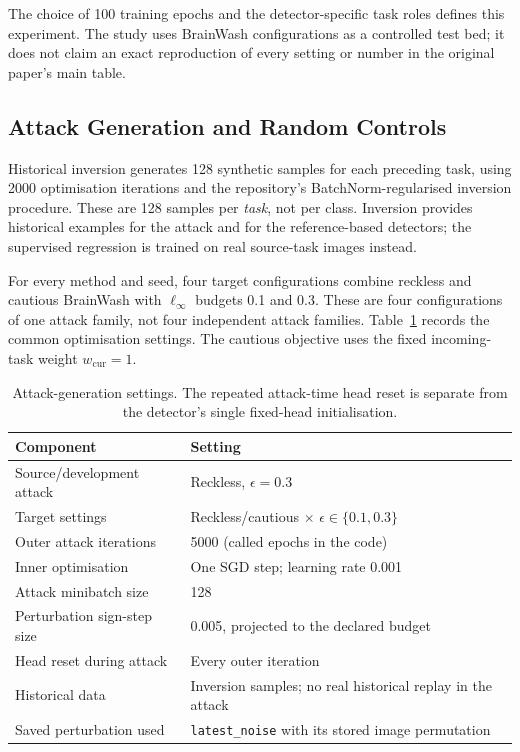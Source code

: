 The choice of 100 training epochs and the detector-specific task roles
defines this experiment. The study uses BrainWash configurations as a
controlled test bed; it does not claim an exact reproduction of every
setting or number in the original paper's main table.

\subsection{Attack Generation and Random Controls}
\label{subsec:setup-attacks}

Historical inversion generates 128 synthetic samples for each preceding
task, using 2000 optimisation iterations and the repository's
BatchNorm-regularised inversion procedure. These are 128 samples per
\emph{task}, not per class. Inversion provides historical examples for the
attack and for the reference-based detectors; the supervised regression is
trained on real source-task images instead.

For every method and seed, four target configurations combine reckless
and cautious BrainWash with $\ell_\infty$ budgets 0.1 and 0.3. These are
four configurations of one attack family, not four independent attack
families. Table~\ref{tab:setup-attack} records the common optimisation
settings. The cautious objective uses the fixed incoming-task weight
$w_{\mathrm{cur}}=1$.

\begin{table}[tbp]
\centering
\small
\begin{tabularx}{\textwidth}{p{5.5cm}X}
\toprule
Component & Setting\\
\midrule
Source/development attack & Reckless, $\epsilon=0.3$\\
Target settings & Reckless/cautious $\times$ $\epsilon\in\{0.1,0.3\}$\\
Outer attack iterations & 5000 (called epochs in the code)\\
Inner optimisation & One SGD step; learning rate 0.001\\
Attack minibatch size & 128\\
Perturbation sign-step size & 0.005, projected to the declared budget\\
Head reset during attack & Every outer iteration\\
Historical data & Inversion samples; no real historical replay in the attack\\
Saved perturbation used & \texttt{latest\_noise} with its stored image permutation\\
\bottomrule
\end{tabularx}
\caption{Attack-generation settings. The repeated attack-time head reset
is separate from the detector's single fixed-head initialisation.}
\label{tab:setup-attack}
\end{table}

